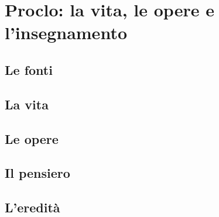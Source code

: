 \chapter{Proclo: la vita, le opere e l'insegnamento}

\section{Le fonti}

\section{La vita}

\section{Le opere}

\section{Il pensiero}

\section{L'eredità}
